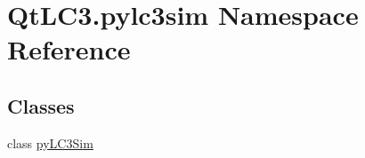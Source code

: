 \hypertarget{namespace_qt_l_c3_1_1pylc3sim}{\section{Qt\-L\-C3.\-pylc3sim Namespace Reference}
\label{namespace_qt_l_c3_1_1pylc3sim}
}
\subsection*{Classes}
\begin{DoxyCompactItemize}
\item 
class \hyperlink{class_qt_l_c3_1_1pylc3sim_1_1py_l_c3_sim}{py\-L\-C3\-Sim}
\end{DoxyCompactItemize}
